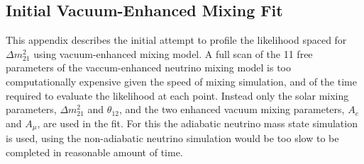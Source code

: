 \begin{appendices}

\chapter{Initial Vacuum-Enhanced Mixing Fit}
\label{app:vac_mixing}
This appendix describes the initial attempt to profile the likelihood
spaced for $\Delta m^{2}_{21}$ using vacuum-enhanced mixing model.
A full scan of the  11 free parameters of the vaccum-enhanced neutrino mixing
model is too computationally
expensive given the speed of mixing simulation, and
of the time required to evaluate the likelihood at each point.
Instead only the solar mixing parameters, $\Delta m^2_{21}$ and $\theta_{12}$,
and the two enhanced vacuum mixing parameters, $A_{e}$ and $A_{\mu}$, are
used in the fit. 
For this the adiabatic neutrino mass state simulation is used,
using the non-adiabatic neutrino simulation would be too slow to be completed
in reasonable amount of time.


\end{appendices}
